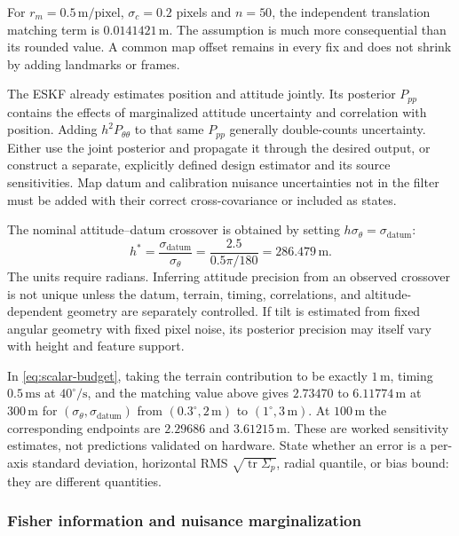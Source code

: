 \documentclass[11pt,a4paper]{article}
\numberwithin{equation}{section}
\begin{document}
For $r_m=0.5\,\mathrm{m/pixel}$, $\sigma_c=0.2$ pixels and $n=50$,
the independent translation matching term is
$0.0141421\,\mathrm m$. The assumption is much more consequential than
its rounded value. A common map offset remains in every fix and does
not shrink by adding landmarks or frames.

The ESKF already estimates position and attitude jointly. Its posterior
$P_{pp}$ contains the effects of marginalized attitude uncertainty and
correlation with position. Adding $h^2P_{\theta\theta}$ to that same
$P_{pp}$ generally double-counts uncertainty. Either use the joint
posterior and propagate it through the desired output, or construct a
separate, explicitly defined design estimator and its source sensitivities.
Map datum and calibration nuisance uncertainties not in the filter
must be added with their correct cross-covariance or included as states.

The nominal attitude--datum crossover is obtained by setting
$h\sigma_\theta=\sigma_{\mathrm{datum}}$:
\begin{equation}
 h^*=\frac{\sigma_{\mathrm{datum}}}{\sigma_\theta}
      =\frac{2.5}{0.5\pi/180}=286.479\,\mathrm m.
\end{equation}
The units require radians. Inferring attitude precision from an observed
crossover is not unique unless the datum, terrain, timing, correlations,
and altitude-dependent geometry are separately controlled. If tilt is
estimated from fixed angular geometry with fixed pixel noise, its
posterior precision may itself vary with height and feature support.

In \eqref{eq:scalar-budget}, taking the terrain contribution to be exactly
$1\,\mathrm m$, timing $0.5\,\mathrm{ms}$ at $40^\circ/\mathrm s$, and
the matching value above gives $2.73470$ to $6.11774\,\mathrm m$ at
$300\,\mathrm m$ for $(\sigma_\theta,\sigma_{\mathrm{datum}})$ from
$(0.3^\circ,2\,\mathrm m)$ to $(1^\circ,3\,\mathrm m)$. At
$100\,\mathrm m$ the corresponding endpoints are $2.29686$ and
$3.61215\,\mathrm m$. These are worked sensitivity estimates, not
predictions validated on hardware. State whether an error is a
per-axis standard deviation, horizontal RMS $\sqrt{\operatorname{tr}
\Sigma_p}$, radial quantile, or bias bound: they are different quantities.

\subsubsection{Fisher information and nuisance marginalization}
\end{document}
